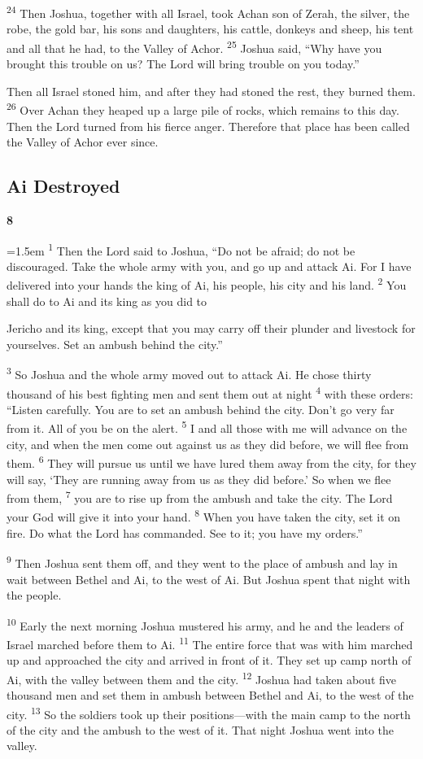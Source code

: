 \documentclass[12pt,twoside]{article}
\newcommand{\vs}[1]{\textsuperscript{#1}}
\newcommand{\chapterWithIndent}[2]{%
  \noindent
  \begin{minipage}[t]{1cm}
    \vspace{-0.4\baselineskip}
    {\fontsize{40pt}{48pt}\selectfont \textbf{#1}}
  \end{minipage}%
  \hspace{0.3cm}%
  \begin{minipage}[t]{\dimexpr\linewidth - 1.5cm - 0.3cm\relax}
    \hangindent=1.5em
    \hangafter=3
    #2
    \vspace{0.1cm}
  \end{minipage}
}
\begin{document}
\vs{24} Then Joshua, together with all Israel, took Achan son of Zerah, the silver, the robe, the gold bar, his sons and daughters, his cattle, donkeys and sheep, his tent and all that he had, to the Valley of Achor.
\vs{25} Joshua said, ``Why have you brought this trouble on us? The Lord will bring trouble on you today.''

Then all Israel stoned him, and after they had stoned the rest, they burned them.
\vs{26} Over Achan they heaped up a large pile of rocks, which remains to this day. Then the Lord turned from his fierce anger. Therefore that place has been called the Valley of Achor ever since.

\subsection*{\textbf{Ai Destroyed}}
\chapterWithIndent{8}{%
  \vs{1} Then the Lord said to Joshua, ``Do not be afraid; do not be discouraged. Take the whole army with you, and go up and attack Ai. For I have delivered into your hands the king of Ai, his people, his city and his land.
  \vs{2} You shall do to Ai and its king as you did to
}

\noindent Jericho and its king, except that you may carry off their plunder and livestock for yourselves. Set an ambush behind the city.''

\vs{3} So Joshua and the whole army moved out to attack Ai. He chose thirty thousand of his best fighting men and sent them out at night
\vs{4} with these orders: ``Listen carefully. You are to set an ambush behind the city. Don't go very far from it. All of you be on the alert.
\vs{5} I and all those with me will advance on the city, and when the men come out against us as they did before, we will flee from them.
\vs{6} They will pursue us until we have lured them away from the city, for they will say, `They are running away from us as they did before.' So when we flee from them,
\vs{7} you are to rise up from the ambush and take the city. The Lord your God will give it into your hand.
\vs{8} When you have taken the city, set it on fire. Do what the Lord has commanded. See to it; you have my orders.''

\vs{9} Then Joshua sent them off, and they went to the place of ambush and lay in wait between Bethel and Ai, to the west of Ai. But Joshua spent that night with the people.

\vs{10} Early the next morning Joshua mustered his army, and he and the leaders of Israel marched before them to Ai.
\vs{11} The entire force that was with him marched up and approached the city and arrived in front of it. They set up camp north of Ai, with the valley between them and the city.
\vs{12} Joshua had taken about five thousand men and set them in ambush between Bethel and Ai, to the west of the city.
\vs{13} So the soldiers took up their positions---with the main camp to the north of the city and the ambush to the west of it. That night Joshua went into the valley.
\end{document}
